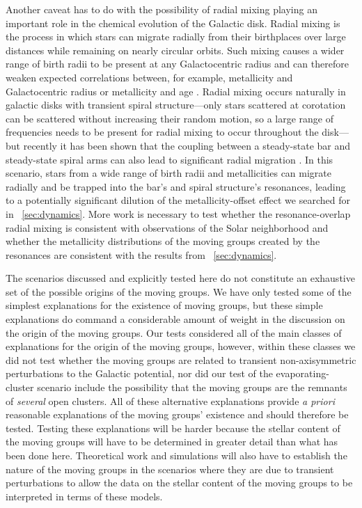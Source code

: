 Another caveat has to do with the possibility of radial mixing playing
an important role in the chemical evolution of the Galactic
disk. Radial mixing \citep{sellwood02a} is the process in which stars
can migrate radially from their birthplaces over large distances while
remaining on nearly circular orbits. Such mixing causes a wider range
of birth radii to be present at any Galactocentric radius and can
therefore weaken expected correlations between, for example,
metallicity and Galactocentric radius or metallicity and age
\citep[\eg,][]{roskar08a}. Radial mixing occurs naturally in galactic
disks with transient spiral structure---only stars scattered at
corotation can be scattered without increasing their random motion, so
a large range of frequencies needs to be present for radial mixing to
occur throughout the disk---but recently it has been shown that the
coupling between a steady-state bar and steady-state spiral arms can
also lead to significant radial migration \citep{Minchev09b}. In this
scenario, stars from a wide range of birth radii and metallicities can
migrate radially and be trapped into the bar's and spiral structure's
resonances, leading to a potentially significant dilution of the
metallicity-offset effect we searched for in
\sectionname~\ref{sec:dynamics}. More work is necessary to test
whether the resonance-overlap radial mixing is consistent with
observations of the Solar neighborhood \citep[\cf][]{schoenrich09a}
and whether the metallicity distributions of the moving groups created
by the resonances are consistent with the results from
\sectionname~\ref{sec:dynamics}.


The scenarios discussed and explicitly tested here do not constitute
an exhaustive set of the possible origins of the moving groups. We
have only tested some of the simplest explanations for the existence
of moving groups, but these simple explanations do command a
considerable amount of weight in the discussion on the origin of the
moving groups. Our tests considered all of the main classes of
explanations for the origin of the moving groups, however, within
these classes we did not test whether the moving groups are related to
transient non-axisymmetric perturbations to the Galactic potential,
nor did our test of the evaporating-cluster scenario include the
possibility that the moving groups are the remnants of \emph{several}
open clusters. All of these alternative explanations provide \emph{a
priori} reasonable explanations of the moving groups' existence and
should therefore be tested. Testing these explanations will be harder
because the stellar content of the moving groups will have to be
determined in greater detail than what has been done here. Theoretical
work and simulations will also have to establish the nature of the
moving groups in the scenarios where they are due to transient
perturbations to allow the data on the stellar content of the moving
groups to be interpreted in terms of these models.

